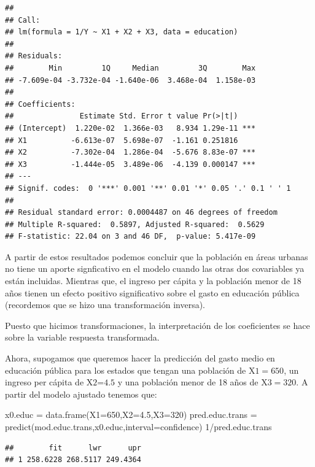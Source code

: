 \documentclass[
]{article}
\newenvironment{Shaded}{\begin{snugshade}}{\end{snugshade}}
\newcommand{\AttributeTok}[1]{\textcolor[rgb]{0.77,0.63,0.00}{#1}}
\newcommand{\DecValTok}[1]{\textcolor[rgb]{0.00,0.00,0.81}{#1}}
\newcommand{\FloatTok}[1]{\textcolor[rgb]{0.00,0.00,0.81}{#1}}
\newcommand{\FunctionTok}[1]{\textcolor[rgb]{0.00,0.00,0.00}{#1}}
\newcommand{\NormalTok}[1]{#1}
\newcommand{\OtherTok}[1]{\textcolor[rgb]{0.56,0.35,0.01}{#1}}
\newcommand{\SpecialCharTok}[1]{\textcolor[rgb]{0.00,0.00,0.00}{#1}}
\newcommand{\StringTok}[1]{\textcolor[rgb]{0.31,0.60,0.02}{#1}}
\begin{document}
\begin{verbatim}
## 
## Call:
## lm(formula = 1/Y ~ X1 + X2 + X3, data = education)
## 
## Residuals:
##        Min         1Q     Median         3Q        Max 
## -7.609e-04 -3.732e-04 -1.640e-06  3.468e-04  1.158e-03 
## 
## Coefficients:
##               Estimate Std. Error t value Pr(>|t|)    
## (Intercept)  1.220e-02  1.366e-03   8.934 1.29e-11 ***
## X1          -6.613e-07  5.698e-07  -1.161 0.251816    
## X2          -7.302e-04  1.286e-04  -5.676 8.83e-07 ***
## X3          -1.444e-05  3.489e-06  -4.139 0.000147 ***
## ---
## Signif. codes:  0 '***' 0.001 '**' 0.01 '*' 0.05 '.' 0.1 ' ' 1
## 
## Residual standard error: 0.0004487 on 46 degrees of freedom
## Multiple R-squared:  0.5897, Adjusted R-squared:  0.5629 
## F-statistic: 22.04 on 3 and 46 DF,  p-value: 5.417e-09
\end{verbatim}

A partir de estos resultados podemos concluir que la población en áreas urbanas no tiene un aporte signficativo en el modelo cuando las otras dos covariables ya están incluidas. Mientras que, el ingreso per cápita y la población menor de 18 años tienen un efecto positivo significativo sobre el gasto en educación pública (recordemos que se hizo una transformación inversa).

Puesto que hicimos transformaciones, la interpretación de los coeficientes se hace sobre la variable respuesta transformada.

Ahora, supogamos que queremos hacer la predicción del gasto medio en educación pública para los estados que tengan una población de \(\mbox{X1}=650\), un ingreso per cápita de \(\mbox{X2=4.5}\) y una población menor de 18 años de \(\mbox{X3}=320\). A partir del modelo ajustado tenemos que:

\begin{Shaded}
\begin{Highlighting}[]
\NormalTok{x0.educ }\OtherTok{=} \FunctionTok{data.frame}\NormalTok{(}\AttributeTok{X1=}\DecValTok{650}\NormalTok{,}\AttributeTok{X2=}\FloatTok{4.5}\NormalTok{,}\AttributeTok{X3=}\DecValTok{320}\NormalTok{)}
\NormalTok{pred.educ.trans }\OtherTok{=} \FunctionTok{predict}\NormalTok{(mod.educ.trans,x0.educ,}\AttributeTok{interval=}\StringTok{\textquotesingle{}confidence\textquotesingle{}}\NormalTok{) }
\DecValTok{1}\SpecialCharTok{/}\NormalTok{pred.educ.trans}
\end{Highlighting}
\end{Shaded}

\begin{verbatim}
##        fit      lwr      upr
## 1 258.6228 268.5117 249.4364
\end{verbatim}
\end{document}
